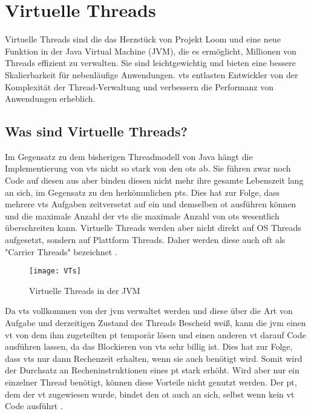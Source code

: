 \section{Virtuelle Threads}                                 %
\label{sec:VirtuelleThreads}

Virtuelle Threads sind die das Herzstück von Projekt Loom und eine neue Funktion in der Java Virtual Machine (JVM), die es ermöglicht, Millionen von Threads effizient zu verwalten.
Sie sind leichtgewichtig und bieten eine bessere Skalierbarkeit für nebenläufige Anwendungen.
\Glspl{vt} entlasten Entwickler von der Komplexität der Thread-Verwaltung und verbessern die Performanz von Anwendungen erheblich.


\subsection{Was sind Virtuelle Threads?}
\label{subsec:WassindVTs?}

    Im Gegensatz zu dem bisherigen Threadmodell von Java hängt die Implementierung von \Glspl{vt} nicht so stark von den \Glspl{ot} ab. Sie führen zwar noch Code 
    auf diesen aus aber binden diesen nicht mehr ihre gesamte Lebenszeit lang an sich, im Gegensatz zu den herkömmlichen \Glspl{pt}. Dies hat zur Folge, 
    dass mehrere \Glspl{vt} Aufgaben zeitversetzt auf ein und demselben \gls{ot} ausführen können und die maximale Anzahl der \Glspl{vt}
    die maximale Anzahl von \Glspl{ot} wesentlich überschreiten kann.
    Virtuelle Threads werden aber nicht direkt auf OS Threads aufgesetzt, sondern auf Plattform Threads.
    Daher werden diese auch oft als "Carrier Threads" bezeichnet \cite{ieee2022}.
    

    \begin{figure}[H]
        \centering
        \texttt{[image: VTs]}
        \caption{Virtuelle Threads in der JVM}
        \label{fig:VTs}
    \end{figure}

    Da \Glspl{vt} vollkommen von der \gls{jvm} verwaltet werden und diese über die Art von Aufgabe und derzeitigen Zustand des Threads Bescheid weiß, kann die
    \gls{jvm} einen \gls{vt} von dem ihm zugeteilten \gls{pt} temporär lösen und einen anderen \gls{vt} darauf Code ausführen lassen, da das Blockieren von \Glspl{vt}
    sehr billig ist. Dies hat zur Folge, dass \Glspl{vt} nur dann Rechenzeit erhalten, wenn sie auch benötigt wird. Somit wird der Durchsatz an Recheninstruktionen
    eines \gls{pt} stark erhöht.
    Wird aber nur ein einzelner Thread benötigt, können diese Vorteile nicht genutzt werden. Der \gls{pt}, dem der \gls{vt} zugewiesen wurde, bindet den \gls{ot} auch
    an sich, selbst wenn kein \gls{vt} Code ausführt \cite{JEP444}.
    

